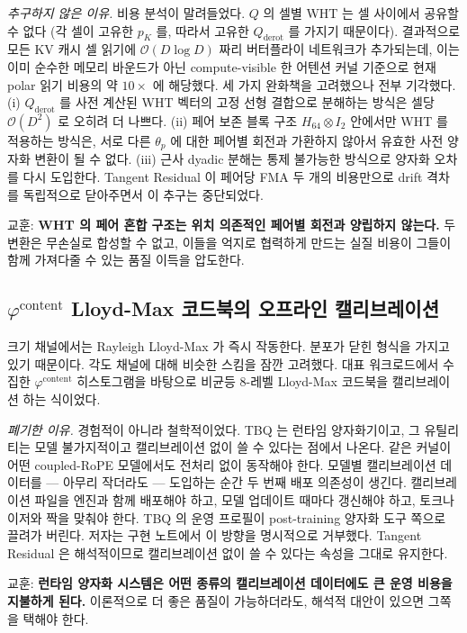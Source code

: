 \documentclass[10pt,twocolumn]{article}
\begin{document}
\emph{추구하지 않은 이유.} 비용 분석이 말려들었다. $Q$ 의 셀별 WHT 는 셀 사이에서 공유할 수 없다 (각 셀이 고유한 $p_K$ 를, 따라서 고유한 $Q_{\text{derot}}$ 를 가지기 때문이다). 결과적으로 모든 KV 캐시 셀 읽기에 $\mathcal{O}(D\log D)$ 짜리 버터플라이 네트워크가 추가되는데, 이는 이미 순수한 메모리 바운드가 아닌 compute-visible 한 어텐션 커널 기준으로 현재 polar 읽기 비용의 약 $10\times$ 에 해당했다. 세 가지 완화책을 고려했으나 전부 기각했다. (i) $Q_{\text{derot}}$ 를 사전 계산된 WHT 벡터의 고정 선형 결합으로 분해하는 방식은 셀당 $\mathcal{O}(D^2)$ 로 오히려 더 나쁘다. (ii) 페어 보존 블록 구조 $H_{64}\otimes I_2$ 안에서만 WHT 를 적용하는 방식은, 서로 다른 $\theta_p$ 에 대한 페어별 회전과 가환하지 않아서 유효한 사전 양자화 변환이 될 수 없다. (iii) 근사 dyadic 분해는 통제 불가능한 방식으로 양자화 오차를 다시 도입한다. Tangent Residual 이 페어당 FMA 두 개의 비용만으로 drift 격차를 독립적으로 닫아주면서 이 추구는 중단되었다.

교훈: \textbf{WHT 의 페어 혼합 구조는 위치 의존적인 페어별 회전과 양립하지 않는다.} 두 변환은 무손실로 합성할 수 없고, 이들을 억지로 협력하게 만드는 실질 비용이 그들이 함께 가져다줄 수 있는 품질 이득을 압도한다.

\subsection{$\varphi^{\text{content}}$ Lloyd-Max 코드북의 오프라인 캘리브레이션}

크기 채널에서는 Rayleigh Lloyd-Max 가 즉시 작동한다. 분포가 닫힌 형식을 가지고 있기 때문이다. 각도 채널에 대해 비슷한 스킴을 잠깐 고려했다. 대표 워크로드에서 수집한 $\varphi^{\text{content}}$ 히스토그램을 바탕으로 비균등 8-레벨 Lloyd-Max 코드북을 캘리브레이션 하는 식이었다.

\emph{폐기한 이유.} 경험적이 아니라 철학적이었다. TBQ 는 런타임 양자화기이고, 그 유틸리티는 모델 불가지적이고 캘리브레이션 없이 쓸 수 있다는 점에서 나온다. 같은 커널이 어떤 coupled-RoPE 모델에서도 전처리 없이 동작해야 한다. 모델별 캘리브레이션 데이터를 --- 아무리 작더라도 --- 도입하는 순간 두 번째 배포 의존성이 생긴다. 캘리브레이션 파일을 엔진과 함께 배포해야 하고, 모델 업데이트 때마다 갱신해야 하고, 토크나이저와 짝을 맞춰야 한다. TBQ 의 운영 프로필이 post-training 양자화 도구 쪽으로 끌려가 버린다. 저자는 구현 노트에서 이 방향을 명시적으로 거부했다. Tangent Residual 은 해석적이므로 캘리브레이션 없이 쓸 수 있다는 속성을 그대로 유지한다.

교훈: \textbf{런타임 양자화 시스템은 어떤 종류의 캘리브레이션 데이터에도 큰 운영 비용을 지불하게 된다.} 이론적으로 더 좋은 품질이 가능하더라도, 해석적 대안이 있으면 그쪽을 택해야 한다.
\end{document}
